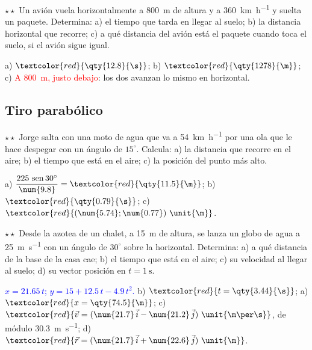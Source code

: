 \begin{exercise}
    \(\star\star\) Un avión vuela horizontalmente a \qty{800}{\m} de altura y a \qty{360}{\km\per\hour} y suelta un paquete.
    Determina: a) el tiempo que tarda en llegar al suelo; b) la distancia horizontal que recorre; c) a qué distancia del avión está el
    paquete cuando toca el suelo, si el avión sigue igual.
    \begin{solu}
        a) \(\textcolor{red}{\qty{12.8}{\s}}\); b) \(\textcolor{red}{\qty{1278}{\m}}\); c) \textcolor{red}{A \qty{800}{\m}, justo
        debajo}: los dos avanzan lo mismo en horizontal.
    \end{solu}
\end{exercise}

\subsection{Tiro parabólico}

\begin{exercise}
    \(\star\star\) Jorge salta con una moto de agua que va a \qty{54}{\km\per\hour} por una ola que le hace despegar con un ángulo de
    \(15^\circ\). Calcula: a) la distancia que recorre en el aire; b) el tiempo que está en el aire; c) la posición del punto más alto.
    \begin{solu}
        a) \(\dfrac{225\,\sen 30^\circ}{\num{9.8}} = \textcolor{red}{\qty{11.5}{\m}}\); b) \(\textcolor{red}{\qty{0.79}{\s}}\);
        c) \(\textcolor{red}{(\num{5.74}; \num{0.77})~\unit{\m}}\).
    \end{solu}
\end{exercise}

\begin{exercise}
    \(\star\star\) Desde la azotea de un chalet, a \qty{15}{\m} de altura, se lanza un globo de agua a \qty{25}{\m\per\s} con un
    ángulo de \(30^\circ\) sobre la horizontal. Determina: a) a qué distancia de la base de la casa cae; b) el tiempo que está en el
    aire; c) su velocidad al llegar al suelo; d) su vector posición en \(t = \qty{1}{\s}\).
    \begin{solu}
        \textcolor{blue}{\(x = \num{21.65}\,t\); \(y = 15 + \num{12.5}\,t - \num{4.9}\,t^2\).} b) \(\textcolor{red}{t = \qty{3.44}{\s}}\);
        a) \(\textcolor{red}{x = \qty{74.5}{\m}}\); c) \(\textcolor{red}{\vec v = (\num{21.7}\,\ivec - \num{21.2}\,\jvec)~\unit{\m\per\s}}\),
        de módulo \qty{30.3}{\m\per\s}; d) \(\textcolor{red}{\vec r = (\num{21.7}\,\ivec + \num{22.6}\,\jvec)~\unit{\m}}\).
    \end{solu}
\end{exercise}

